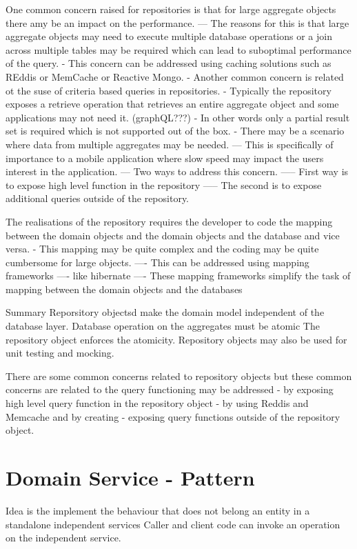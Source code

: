 \documentclass[a4paper, 11pt]{book}
\begin{document}
    One common concern raised for repositories is that for large aggregate objects there amy be an impact on the performance.
    --- The reasons for this is that large aggregate objects may need to execute multiple database operations or a join across multiple tables may be required which can lead to suboptimal performance of the query.
    - This concern can be addressed using caching solutions such as REddis or MemCache or Reactive Mongo.
    - Another common concern is related ot the suse of criteria based queries in repositories.
    - Typically the repository exposes a retrieve operation that retrieves an entire aggregate object and some applications may not need it. (graphQL???)
    - In other words only a partial result set is required which is not supported out of the box.
    - There may be a scenario where data from multiple aggregates may be needed.
    --- This is specifically of importance to a mobile application where slow speed may impact the users interest in the application.
    --- Two ways to address this concern.
    ----- First way is to expose high level function in the repository
    ----- The second is to expose additional queries outside of the repository.

    The realisations of the repository requires the developer to code the mapping between the domain objects and the domain objects and the database and vice versa.
    - This mapping may be quite complex and the coding may be quite cumbersome for large objects.
    ---- This can be addressed using mapping frameworks ---- like hibernate
    ---- These mapping frameworks simplify the task of mapping between the domain objects and the databases

    Summary
    Reporsitory objectsd make the domain model independent of the database layer.
    Database operation on the aggregates must be atomic
    The repository object enforces the atomicity.
    Repository objects may also be used for unit testing and mocking.

    There are some common concerns related to repository objects but these common concerns are related to the query functioning may be addressed
    - by exposing high level query function in the repository object
    - by using Reddis and Memcache and by creating
    - exposing query functions outside of the repository object.



    \section{Domain Service - Pattern}
    Idea is the implement the behaviour that does not belong an entity in a standalone independent services
    Caller and client code can invoke an operation on the independent service.
\end{document}
